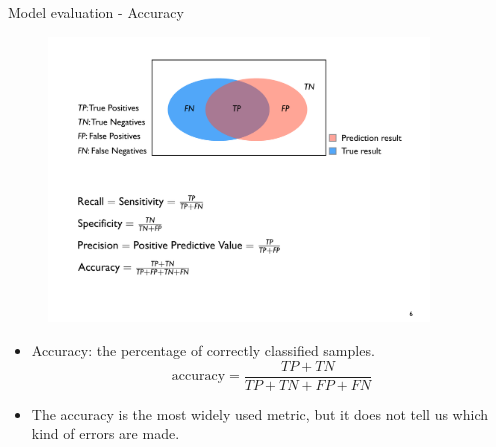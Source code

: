 \documentclass[xcolor=pdftex,dvipsnames,table]{beamer}
\begin{document}
\begin{frame}{Model evaluation - Accuracy}
	\begin{figure}[htb]
		\includegraphics[width=0.9\textwidth]{../graphics/ModelEvaluation.pdf}
	\end{figure}
	\begin{itemize}
		\item Accuracy: the percentage of correctly classified samples.
		\begin{equation}
			\text{accuracy} = \frac{TP + TN}{TP + TN + FP + FN}
		\end{equation}
		\item The accuracy is the most widely used metric, but it does not tell us which kind of errors are made.
	\end{itemize}
\end{frame}
\end{document}

